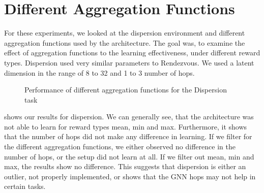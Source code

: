 \section{Different Aggregation Functions}
\label{sec:Different Aggregation Functions}
For these experiments, we looked at the dispersion environment and different aggregation functions used by the architecture. The goal was, to examine the effect of aggregation functions to the learning effectiveness, under different reward types. Dispersion used very similar parameters to Rendezvous. We used a latent dimension in the range of 8 to 32 and 1 to 3 number of hops.


\begin{figure}[htp]
    \centering
    \hspace{1cm}                       
    \caption{Performance of different aggregation functions for the Dispersion task}
    \label{fig:aggregation-compare}
\end{figure}

 shows our results for dispersion. We can generally see, that the architecture was not able to learn for reward types mean, min and max. Furthermore, it shows that the number of hops did not make any difference in learning. If we filter for the different aggregation functions, we either observed no difference in the number of hops, or the setup did not learn at all. If we filter out mean, min and max, the results show no difference. This suggests that dispersion is either an outlier, not properly implemented, or shows that the GNN hops may not help in certain tasks. 


